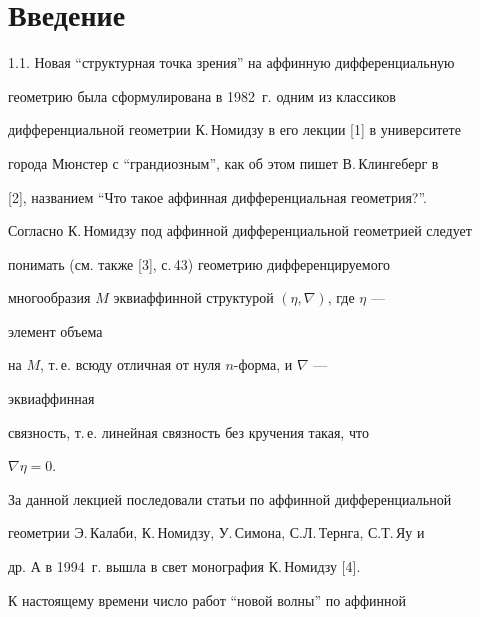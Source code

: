 \maketitle 


\label{begin} 


 


 


 


\section{Введение} 


 


1.1. Новая ``структурная точка зрения'' на аффинную дифференциальную 


геометрию была сформулирована в 1982~г. одним из классиков 


дифференциальной геометрии К.\,Номидзу в его лекции [1] в университете 


города Мюнстер с ``грандиозным'', как об этом пишет В.\,Клингеберг в 


[2], названием ``Что такое аффинная дифференциальная геометрия?''. 


Согласно К.\,Номидзу под аффинной дифференциальной геометрией следует 


понимать (см. также [3], с.\,43) геометрию дифференцируемого 


многообразия $M$ эквиаффинной структурой $(\eta,\nabla)$, где $\eta$ --- 


элемент объема 


на $M$, т.\,е. всюду отличная от нуля $n$-форма, и $\nabla$ --- 


эквиаффинная 


связность, т.\,е. линейная связность без кручения такая, что 


$\nabla\eta=0$. 


 


За данной лекцией последовали статьи по аффинной дифференциальной 


геометрии Э.\,Ка\-ла\-би, К.\,Номидзу, У.\,Симона, С.Л.\,Тернга, С.Т.\,Яу и 


др. А в 1994~г. вышла в свет монография К.\,Номидзу [4]. 


 


К настоящему времени число работ ``новой волны'' по аффинной 



